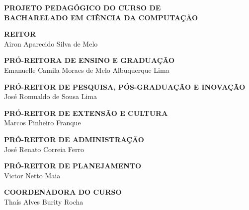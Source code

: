 \documentclass[
	12pt,				%
	openright,			%
  oneside,     %
	a4paper,			%
	english,			%
	french,				%
	spanish,			%
	brazil				%
	]{abntex2}
\begin{document}






\begin{center}
  \textbf{PROJETO PEDAGÓGICO DO CURSO DE\\BACHARELADO EM CIÊNCIA DA COMPUTAÇÃO}

  \vspace{36pt}

  \textbf{REITOR} \\
  Airon Aparecido Silva de Melo
  
  \vspace{16pt}

  \textbf{PRÓ-REITORA DE ENSINO E GRADUAÇÃO} \\
  Emanuelle Camila Moraes de Melo Albuquerque Lima
  
  \vspace{16pt}
  
  \textbf{PRÓ-REITOR DE PESQUISA, PÓS-GRADUAÇÃO E INOVAÇÃO}\\
  José Romualdo de Sousa Lima
  
  \vspace{16pt}
  
  \textbf{PRÓ-REITOR DE EXTENSÃO E CULTURA}\\
  Marcos Pinheiro Franque
  
  \vspace{16pt}

  \textbf{PRÓ-REITOR DE ADMINISTRAÇÃO}\\
  José Renato Correia Ferro
  
  \vspace{16pt}

  \textbf{PRÓ-REITOR DE PLANEJAMENTO}\\
  Victor Netto Maia
  
  \vspace{16pt}

  \textbf{COORDENADORA DO CURSO}\\
  Thaís Alves Burity Rocha


\end{center}
\end{document}

